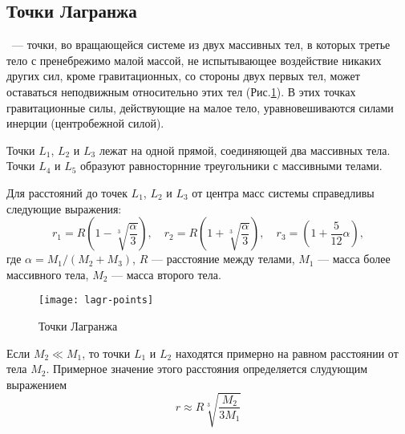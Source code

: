 \subsection{Точки Лагранжа}

~--- точки, во вращающейся системе из двух
массивных тел, в которых третье тело с пренебрежимо 
малой массой, не испытывающее воздействие никаких 
других сил, кроме гравитационных, со стороны двух 
первых тел, может оставаться неподвижным относительно 
этих тел (Рис.\ref{pic:lagr-points}). В этих точках гравитационные силы, действующие на малое тело, уравновешиваются силами инерции (центробежной силой).

Точки $L_1$, $L_2$ и $L_3$ лежат на одной прямой, 
соединяющей два массивных тела. Точки $L_4$ и $L_5$ 
образуют равносторнние треугольники с массивными 
телами.

Для расстояний до точек $L_1$, $L_2$ и $L_3$ от 
центра масс системы справедливы следующие выражения:
\begin{equation}r_1=R\left(1-\sqrt[3]{\frac{\alpha}
{3}}\right), \quad r_2=R\left(1+\sqrt[3]{\frac{\alpha}
{3}}\right), \quad r_3=\left(1+\frac{5}{12}\alpha\right),
\end{equation}
где $\alpha=M_1/(M_2+M_3)$, $R$ --- расстояние между 
телами, $M_1$ --- масса более массивного тела, $M_2$
 --- масса второго тела.
\begin{figure}[h!]
\centering
\texttt{[image: lagr-points]}
\caption{Точки Лагранжа}\label{pic:lagr-points}
\end{figure}

Если $M_2\ll M_1$, то точки $L_1$ и $L_2$ находятся 
примерно на равном расстоянии от тела $M_2$. 
Примерное значение этого расстояния определяется слудующим выражением\begin{equation}
r\approx R\sqrt[3]{\frac{M_2}{3M_1}}
\end{equation}
